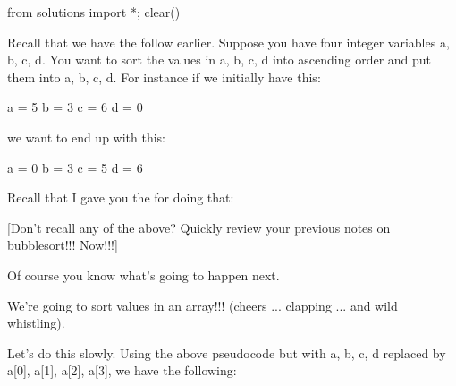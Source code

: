 \begin{python0}
from solutions import *; clear()
\end{python0}

Recall that we have the follow earlier. Suppose you have four integer variables a, b, c, d. You want to sort the values in a, b, c, d into ascending order and put them into a, b, c, d. For instance if we initially have this:
\begin{center}
a = 5 b = 3 c = 6 d = 0
\end{center}
we want to end up with this:
\begin{center}
a = 0 b = 3 c = 5 d = 6
\end{center}
Recall that I gave you the  for doing that:


[Don't recall any of the above? Quickly review your previous notes on bubblesort!!! Now!!!]

Of course you know what's going to happen next.

We're going to sort values in an array!!! (cheers ... clapping ... and wild whistling).

Let's do this slowly. Using the above pseudocode but with a, b, c, d replaced by a[0], a[1], a[2], a[3], we have the following:

